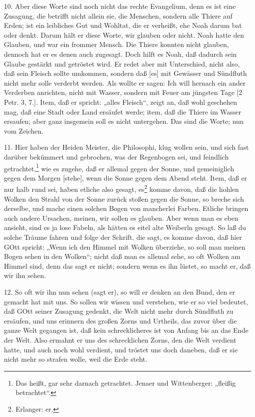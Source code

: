 10. Aber diese Worte sind noch nicht das rechte Evangelium, denn es ist eine Zusagung, die betrifft nicht allein sie, die Menschen, sondern alle Thiere auf Erden; ist ein leibliches Gut und Wohltat, die er verheißt, ehe Noah darum bat oder denkt. Darum hält er diese Worte, wir glauben oder nicht. Noah hatte den Glauben, und war ein frommer Mensch. Die Thiere konnten nicht glauben, dennoch hat er es denen auch zugesagt. Doch hilft es Noah, daß dadurch sein Glaube gestärkt und getröstet wird. Er redet aber mit Unterschied, nicht also, daß sein Fleisch sollte umkommen, sondern daß [es] mit Gewässer und Sündfluth nicht mehr solle verderbt werden. Als wollte er sagen: Ich will hernach ein ander Verderben anrichten, nicht mit Wasser, sondern mit Feuer am jüngsten Tage [2 Petr. 3, 7.]. Item, daß er spricht: „alles Fleisch“, zeigt an, daß wohl geschehen mag, daß eine Stadt oder Land ersäufet werde; item, daß die Thiere im Wasser ersaufen; aber ganz insgemein soll es nicht untergehen. Das sind die Worte; nun vom Zeichen.

11. Hier haben der Heiden Meister, die Philosophi, klug wollen sein, und sich fast darüber bekümmert und gebrochen, was der Regenbogen sei, und feindlich getrachtet,\footnote{Das heißt, gar sehr darnach getrachtet. Jenaer und Wittenberger: „fleißig betrachtet“.} wie es zugehe, daß er allemal gegen der Sonne, und gemeiniglich gegen dem Morgen [stehe], wenn die Sonne gegen dem Abend steht. Item, daß er nur halb rund sei, haben etliche also gesagt, es\footnote{Erlanger: er.} komme davon, daß die hohlen Wolken den Strahl von der Sonne zurück stoßen gegen die Sonne, so breche sich derselbe, und mache einen solchen Bogen von mancherlei Farben. Etliche bringen auch andere Ursachen, meinen, wir sollen es
glauben. Aber wenn man es eben ansieht, sind es ja lose Fabeln, als hätten es eitel alte Weiberln gesagt. So laß du solche Träume fahren und folge der Schrift, die sagt, es komme davon, daß hier GOtt spricht: „Wenn ich den Himmel mit Wolken überziehe, so soll man meinen Bogen sehen in den Wolken“; nicht daß man es allemal sehe, so oft Wolken am Himmel sind, denn das sagt er nicht; sondern wenn es ihn lüstet, so macht er, daß wir ihn sehen.

12. So oft wir ihn nun sehen (sagt er), so will er denken an den Bund, den er gemacht hat mit uns. So sollen wir wissen und verstehen, wie er so viel bedeutet, daß GOtt seiner Zusagung gedenkt, die Welt nicht mehr durch Sündfluth zu ersäufen, und uns erinnern des großen Zorns und Urtheils, das zuvor über die ganze Welt gegangen ist, daß kein schrecklicheres ist von Anfang bis an das Ende der Welt. Also ermahnt er uns des schrecklichen Zorns, den die Welt verdient hatte, und auch noch wohl verdient, und tröstet uns doch daneben, daß er sie nicht mehr so strafen wolle, weil die Erde steht.

